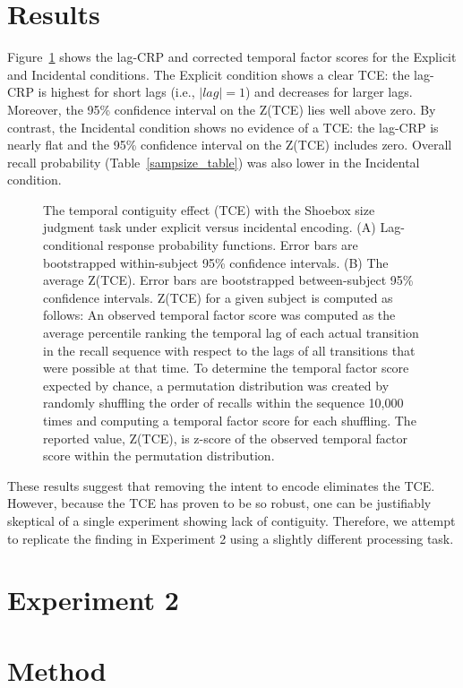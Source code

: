 \documentclass[man,natbib,floatsintext]{apa6} %
\begin{document}
\section{Results}

Figure~\ref{shoebox} shows the lag-CRP and corrected temporal factor scores for the Explicit and Incidental conditions. The Explicit condition shows a clear TCE: the lag-CRP is highest for short lags (i.e., $|lag|=1$) and decreases for larger lags. Moreover, the 95\% confidence interval on the Z(TCE) lies well above zero. By contrast, the Incidental condition shows no evidence of a TCE: the lag-CRP is nearly flat and the 95\% confidence interval on the Z(TCE) includes zero. Overall recall probability (Table~\ref{sampsize_table}) was also lower in the Incidental condition.


\newcommand\paneltext{(A) Lag-conditional response probability functions. Error bars are bootstrapped within-subject 95\% confidence intervals. (B) The average Z(TCE).  Error bars are bootstrapped between-subject 95\% confidence intervals. Z(TCE) for a given subject is computed as follows: An observed temporal factor score was computed as the average percentile ranking the temporal lag of each actual transition in the recall sequence with respect to the lags of all transitions that were possible at that time. To determine the temporal factor score expected by chance, a permutation distribution was created by randomly shuffling the order of recalls within the sequence 10,000 times and computing a temporal factor score for each shuffling. The reported value, Z(TCE), is z-score of the observed temporal factor score within the permutation distribution.}
\begin{figure}
\caption{The temporal contiguity effect (TCE) with the Shoebox size judgment task under explicit versus incidental encoding. \paneltext}
\label{shoebox}
\end{figure}

These results suggest that removing the intent to encode eliminates the TCE. However, because the TCE has proven to be so robust, one can be justifiably skeptical of a single experiment showing lack of contiguity. Therefore, we attempt to replicate the finding in Experiment 2 using a slightly different processing task.

\section{Experiment 2}
\section{Method}
\end{document}
